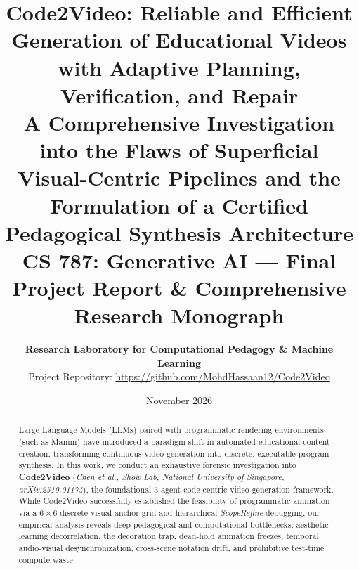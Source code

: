 \documentclass[11pt, a4paper]{article}
\title{\textbf{\Large Code2Video: Reliable and Efficient Generation of Educational Videos with Adaptive Planning, Verification, and Repair}\\[0.6em]
\large A Comprehensive Investigation into the Flaws of Superficial Visual-Centric Pipelines and the Formulation of a Certified Pedagogical Synthesis Architecture\\[0.4em]
\normalsize CS 787: Generative AI --- Final Project Report \& Comprehensive Research Monograph}
\author{\textbf{Research Laboratory for Computational Pedagogy \& Machine Learning}\\
Project Repository: \url{https://github.com/MohdHassaan12/Code2Video}}
\date{November 2026}
\begin{document}
\maketitle

\begin{abstract}
\noindent Large Language Models (LLMs) paired with programmatic rendering environments (such as Manim) have introduced a paradigm shift in automated educational content creation, transforming continuous video generation into discrete, executable program synthesis. In this work, we conduct an exhaustive forensic investigation into \textbf{Code2Video} (\textit{Chen et al., Show Lab, National University of Singapore, arXiv:2510.01174}), the foundational 3-agent code-centric video generation framework. While Code2Video successfully established the feasibility of programmatic animation via a $6\times 6$ discrete visual anchor grid and hierarchical \textit{ScopeRefine} debugging, our empirical analysis reveals deep pedagogical and computational bottlenecks: aesthetic-learning decorrelation, the decoration trap, dead-hold animation freezes, temporal audio-visual desynchronization, cross-scene notation drift, and prohibitive test-time compute waste.


\end{abstract}
\end{document}
